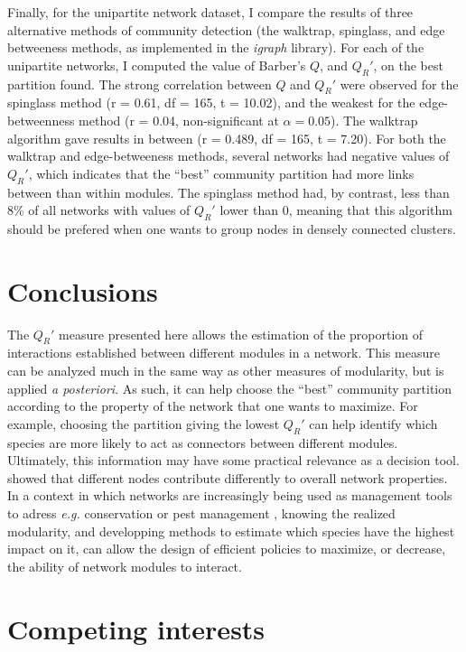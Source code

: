 \documentclass[12pt,oneside]{article}
\begin{document}
Finally, for the unipartite network dataset, I compare the results of three
alternative methods of community detection (the walktrap, spinglass, and edge
betweeness methods, as implemented in the \emph{igraph} library). For each of
the unipartite networks, I computed the value of Barber's $Q$, and $Q_R'$, on
the best partition found. The strong correlation between $Q$ and $Q_R'$ were
observed for the spinglass method (r = 0.61, df = 165, t = 10.02), and the
weakest for the edge-betweenness method (r = 0.04, non-significant at $\alpha =
0.05$). The walktrap algorithm gave results in between (r = 0.489, df = 165, t
= 7.20). For both the walktrap and edge-betweeness methods, several networks
had negative values of $Q_R'$, which indicates that the ``best'' community
partition had more links between than within modules. The spinglass method had,
by contrast, less than 8\% of all networks with values of $Q_R'$ lower than 0,
meaning that this algorithm should be prefered when one wants to group nodes in
densely connected clusters.

\section{Conclusions}

The $Q_R'$ measure presented here allows the estimation of the proportion of
interactions established between different modules in a network. This measure
can be analyzed much in the same way as other measures of modularity, but is
applied \emph{a posteriori}. As such, it can help choose the ``best''
community partition according to the property of the network that one wants to
maximize. For example, choosing the partition giving the lowest $Q_R'$ can help
identify which species are more likely to act as connectors between different
modules. Ultimately, this information may have some practical relevance as a
decision tool. \textcite{saavedra_strong_2011} showed that different nodes
contribute differently to overall network properties. In a context in which
networks are increasingly being used as management tools to adress \emph{e.g.}
conservation or pest management \cite{chades_general_2011}, knowing the
realized modularity, and developping methods to estimate which species have the
highest impact on it, can allow the design of efficient policies to maximize, or
decrease, the ability of network modules to interact.

\section*{Competing interests}
\end{document}
